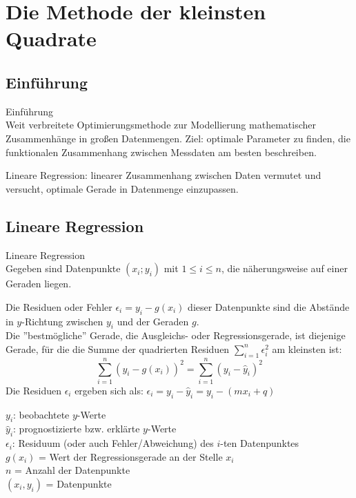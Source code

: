 \section{Die Methode der kleinsten Quadrate}

\subsection{Einführung}
\begin{concept}{Einführung}\\
Weit verbreitete Optimierungsmethode zur Modellierung mathematischer Zusammenhänge in großen Datenmengen. 
Ziel: optimale Parameter zu finden, die funktionalen Zusammenhang zwischen Messdaten am besten beschreiben. 

Lineare Regression: linearer Zusammenhang zwischen Daten vermutet und versucht, optimale Gerade in Datenmenge einzupassen.
\end{concept}

\subsection{Lineare Regression}

\begin{definition}{Lineare Regression}\\
Gegeben sind Datenpunkte $(x_i; y_i)$ mit $1 \leq i \leq n$, die näherungsweise auf einer Geraden liegen. 

Die Residuen oder Fehler $\epsilon_i = y_i - g(x_i)$ dieser Datenpunkte sind die Abstände in $y$-Richtung zwischen $y_i$ und der Geraden $g$.\\

Die ''bestmögliche'' Gerade, die Ausgleichs- oder Regressionsgerade, ist diejenige Gerade, für die die Summe der quadrierten Residuen $\sum_{i=1}^n \epsilon_i^2$ am kleinsten ist:
\vspace{-4mm}\\
\[\sum_{i=1}^n (y_i - g(x_i))^2 = \sum_{i=1}^n (y_i - \hat{y}_i)^2\]
Die Residuen $\epsilon_i$ ergeben sich als:
$\epsilon_i = y_i - \hat{y}_i = y_i - (mx_i + q)$
\end{definition}

\begin{remark}
$y_i$: beobachtete $y$-Werte\\
$\hat{y}_i$: prognostizierte bzw. erklärte $y$-Werte\\
$\epsilon_i$: Residuum (oder auch Fehler/Abweichung) des $i$-ten Datenpunktes\\
$g(x_i)$ = Wert der Regressionsgerade an der Stelle $x_i$\\
$n$ = Anzahl der Datenpunkte\\
$(x_i, y_i)$ = Datenpunkte
\end{remark}


